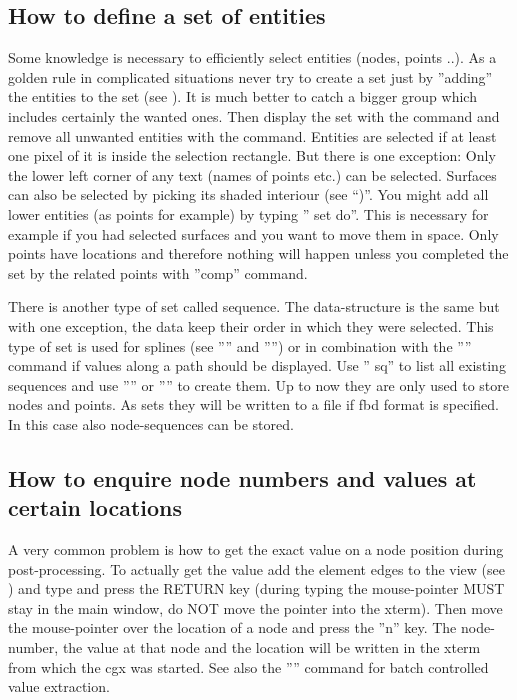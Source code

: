 \documentclass{article}
\begin{document}
\begin{appendix}
\subsection{\label{How to define a set of entities}How to define a set of entities}
Some knowledge is necessary to efficiently select entities (nodes, points ..). As a golden rule in complicated situations never try to create a set just by ''adding'' the entities to the set (see ). It is much better to catch a bigger group which includes certainly the wanted ones. Then display the set with the  command and remove all unwanted entities with the  command. Entities are selected if at least one pixel of it is inside the selection rectangle. But there is one exception: Only the lower left corner of any text (names of points etc.) can be selected. Surfaces can also be selected by picking its shaded interiour (see ``)''. You might add all lower entities (as points for example) by typing '' set do''. This is necessary for example if you had selected surfaces and you want to move them in space. Only points have locations and therefore nothing will happen unless you completed the set by the related points with ''comp'' command.

There is another type of set called sequence. The data-structure is the same but with one exception, the data keep their order in which they were selected. This type of set is used for splines (see '''' and '''') or in combination with the '''' command if values along a path should be displayed. Use '' sq'' to list all existing sequences and use '''' or '''' to create them. Up to now they are only used to store nodes and points. As sets they will be written to a file if fbd format is specified. In this case also node-sequences can be stored.

\subsection{\label{How to enquire node numbers and values at certain locations}How to enquire node numbers and values at certain locations}
A very common problem is how to get the exact value on a node position during post-processing. To actually get the value add the element edges to the view (see ) and type  and press the RETURN key (during typing the mouse-pointer MUST stay in the main window, do NOT move the pointer into the xterm). Then move the mouse-pointer over the location of a node and press the ''n'' key. The node-number, the value at that node and the location will be written in the xterm from which the cgx was started. See also the '''' command for batch controlled value extraction.


\end{appendix}
\end{document}
